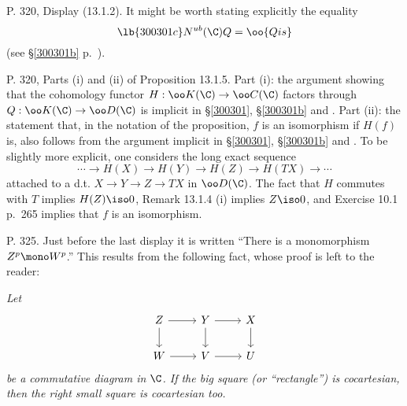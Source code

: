 \documentclass[12pt]{article}
\theoremstyle{remark}
\theoremstyle{definition}
\begin{document}

\begin{s}
P. 320, Display (13.1.2). It might be worth stating explicitly the equality 
\begin{equation}\lb{300301c}
N^{ub}(\C)Q=\oo{Qis}
\end{equation}
(see \S\ref{300301b} p.~).
\end{s}

%

\begin{s}
P. 320, Parts (i) and (ii) of Proposition 13.1.5. Part (i): the argument showing that the cohomology functor $H:\oo K(\C)\to\oo C(\C)$ factors through $Q:\oo K(\C)\to\oo D(\C)$ is implicit in \S\ref{300301}, \S\ref{300301b} and . Part (ii): the statement that, in the notation of the proposition, $f$ is an isomorphism if $H(f)$ is, also follows from the argument implicit in \S\ref{300301}, \S\ref{300301b} and . To be slightly more explicit, one considers the long exact sequence 
$$
\cdots\to H(X)\to H(Y)\to H(Z)\to H(TX)\to\cdots
$$ 
attached to a d.t. $X\to Y\to Z\to TX$ in $\oo D(\C)$. The fact that $H$ commutes with $T$ implies $H(Z)\iso0$, Remark 13.1.4 (i) implies $Z\iso0$, and Exercise 10.1 p.~265 implies that $f$ is an isomorphism.
\end{s}

%

\begin{s}
P. 325. Just before the last display it is written ``There is a monomorphism $Z^p\mono W^p$.'' This results from the following fact, whose proof is left to the reader:

\nn\emph{Let}  
$$
\begin{tikzcd}
Z\ar[d]\ar[r]&Y\ar[d]\ar[r]&X\ar[d]\\ 
W\ar[r]&V\ar[r]&U
\end{tikzcd}
$$ 
\emph{be a commutative diagram in $\C$. If the big square (or ``rectangle'') is cocartesian, then the right small square is cocartesian too.}
\end{s}
\end{document}

